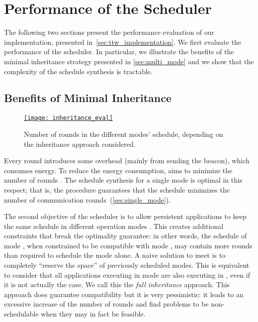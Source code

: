 
\section{Performance of the \TTW Scheduler}
\label{sec:ttw_evaluation_sched}

The following two sections present the performance evaluation of our \TTW implementation, presented in~\cref{sec:ttw_implementation}.
We first evaluate the performance of the scheduler. In particular, we illustrate the benefits of the minimal inheritance strategy presented in \cref{sec:multi_mode} and we show that the complexity of the schedule synthesis is tractable.

\subsection{Benefits of Minimal Inheritance}

\begin{figure}
  \centering
  \href{\ttwfig{Figure-11}}{%
  \texttt{[image: inheritance\_eval]}}
  \caption{Number of rounds in the different modes' schedule, depending on the inheritance approach considered.
  }
  \label{fig:inheritance_eval}
\end{figure}

Every round introduces some overhead (mainly from  sending the beacon), which consumes energy.
To reduce the energy consumption, \TTW aims to minimize the number of rounds .
The schedule synthesis for a single mode is optimal in this respect; that is, the procedure guarantees that the schedule minimizes the number of communication rounds~(\cref{sec:single_mode}).

The second objective of the scheduler is to allow persistent applications to keep the same schedule in different operation modes .
This creates additional constraints that break the optimality guarantee: in other words, the schedule of mode \modej, when constrained to be compatible with mode \modei, may contain more rounds than required to schedule the mode \modej alone.
A naive solution to meet  is to completely ``reserve the space'' of previously scheduled modes. This is equivalent to consider that all applications executing in mode \modei are also executing in \modej, even if it is not actually the case. We call this the \emph{full inheritance} approach.
This approach does guarantee compatibility but it is very pessimistic: it leads to an excessive increase of the number of rounds and find problems to be non-schedulable when they may in fact be feasible.



